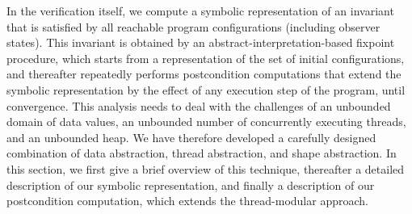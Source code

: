 In the  verification itself, we compute a symbolic representation
of an invariant that is satisfied by all reachable program configurations (including observer states).
This invariant is obtained by an abstract-interpretation-based
fixpoint procedure, which starts
from a representation of the set of initial configurations, and
thereafter repeatedly performs
postcondition computations that extend the
symbolic representation by the effect of any execution step of the program,
until convergence.
This analysis needs to deal with the challenges of an unbounded domain of
data values, an unbounded number of concurrently executing threads, and an
unbounded heap. We have therefore developed a carefully designed combination of
data abstraction, thread abstraction, and shape abstraction. 
In this
section, we first give a brief overview of this technique, thereafter
a detailed description of our symbolic representation, and finally a
description of our postcondition computation, which extends the thread-modular
approach.

